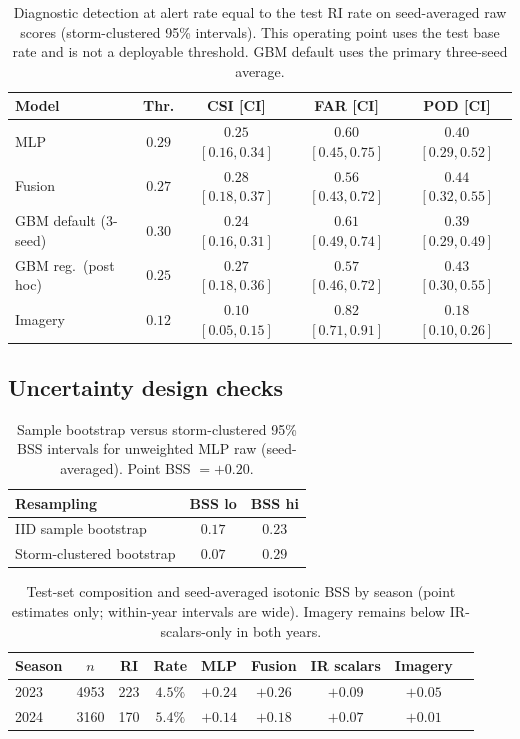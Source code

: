 \documentclass[11pt]{article}
\begin{document}
\begin{table}[H]
\centering
\caption{Diagnostic detection at alert rate equal to the test RI rate on seed-averaged raw scores (storm-clustered 95\% intervals). This operating point uses the test base rate and is not a deployable threshold. GBM default uses the primary three-seed average.}
\label{tab:detection}
\scriptsize
\begin{tabular}{lcccc}
\toprule
Model & Thr. & CSI [CI] & FAR [CI] & POD [CI] \\
\midrule
MLP & $0.29$ & $0.25$ $[0.16,0.34]$ & $0.60$ $[0.45,0.75]$ & $0.40$ $[0.29,0.52]$ \\
Fusion & $0.27$ & $0.28$ $[0.18,0.37]$ & $0.56$ $[0.43,0.72]$ & $0.44$ $[0.32,0.55]$ \\
GBM default (3-seed) & $0.30$ & $0.24$ $[0.16,0.31]$ & $0.61$ $[0.49,0.74]$ & $0.39$ $[0.29,0.49]$ \\
GBM reg.\ (post hoc) & $0.25$ & $0.27$ $[0.18,0.36]$ & $0.57$ $[0.46,0.72]$ & $0.43$ $[0.30,0.55]$ \\
Imagery & $0.12$ & $0.10$ $[0.05,0.15]$ & $0.82$ $[0.71,0.91]$ & $0.18$ $[0.10,0.26]$ \\
\bottomrule
\end{tabular}
\end{table}

\subsection{Uncertainty design checks}

\begin{table}[H]
\centering
\caption{Sample bootstrap versus storm-clustered 95\% BSS intervals for unweighted MLP raw (seed-averaged). Point BSS $=+0.20$.}
\label{tab:sample}
\begin{tabular}{lcc}
\toprule
Resampling & BSS lo & BSS hi \\
\midrule
IID sample bootstrap & $0.17$ & $0.23$ \\
Storm-clustered bootstrap & $0.07$ & $0.29$ \\
\bottomrule
\end{tabular}
\end{table}

\begin{table}[H]
\centering
\caption{Test-set composition and seed-averaged isotonic BSS by season (point estimates only; within-year intervals are wide). Imagery remains below IR-scalars-only in both years.}
\label{tab:year}
\begin{tabular}{lcccccccc}
\toprule
Season & $n$ & RI & Rate & MLP & Fusion & IR scalars & Imagery \\
\midrule
2023 & 4953 & 223 & $4.5\%$ & $+0.24$ & $+0.26$ & $+0.09$ & $+0.05$ \\
2024 & 3160 & 170 & $5.4\%$ & $+0.14$ & $+0.18$ & $+0.07$ & $+0.01$ \\
\bottomrule
\end{tabular}
\end{table}
\end{document}
